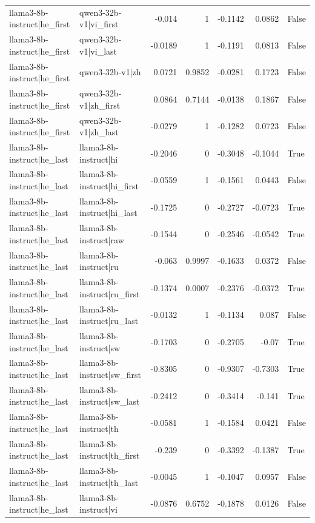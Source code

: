 \begin{table}
\begin{tabular}{l l r r r r l}
llama3-8b-instruct|he_first & qwen3-32b-v1|vi_first & -0.014 & 1 & -0.1142 & 0.0862 & False \\
llama3-8b-instruct|he_first & qwen3-32b-v1|vi_last & -0.0189 & 1 & -0.1191 & 0.0813 & False \\
llama3-8b-instruct|he_first & qwen3-32b-v1|zh & 0.0721 & 0.9852 & -0.0281 & 0.1723 & False \\
llama3-8b-instruct|he_first & qwen3-32b-v1|zh_first & 0.0864 & 0.7144 & -0.0138 & 0.1867 & False \\
llama3-8b-instruct|he_first & qwen3-32b-v1|zh_last & -0.0279 & 1 & -0.1282 & 0.0723 & False \\
llama3-8b-instruct|he_last & llama3-8b-instruct|hi & -0.2046 & 0 & -0.3048 & -0.1044 & True \\
llama3-8b-instruct|he_last & llama3-8b-instruct|hi_first & -0.0559 & 1 & -0.1561 & 0.0443 & False \\
llama3-8b-instruct|he_last & llama3-8b-instruct|hi_last & -0.1725 & 0 & -0.2727 & -0.0723 & True \\
llama3-8b-instruct|he_last & llama3-8b-instruct|raw & -0.1544 & 0 & -0.2546 & -0.0542 & True \\
llama3-8b-instruct|he_last & llama3-8b-instruct|ru & -0.063 & 0.9997 & -0.1633 & 0.0372 & False \\
llama3-8b-instruct|he_last & llama3-8b-instruct|ru_first & -0.1374 & 0.0007 & -0.2376 & -0.0372 & True \\
llama3-8b-instruct|he_last & llama3-8b-instruct|ru_last & -0.0132 & 1 & -0.1134 & 0.087 & False \\
llama3-8b-instruct|he_last & llama3-8b-instruct|sw & -0.1703 & 0 & -0.2705 & -0.07 & True \\
llama3-8b-instruct|he_last & llama3-8b-instruct|sw_first & -0.8305 & 0 & -0.9307 & -0.7303 & True \\
llama3-8b-instruct|he_last & llama3-8b-instruct|sw_last & -0.2412 & 0 & -0.3414 & -0.141 & True \\
llama3-8b-instruct|he_last & llama3-8b-instruct|th & -0.0581 & 1 & -0.1584 & 0.0421 & False \\
llama3-8b-instruct|he_last & llama3-8b-instruct|th_first & -0.239 & 0 & -0.3392 & -0.1387 & True \\
llama3-8b-instruct|he_last & llama3-8b-instruct|th_last & -0.0045 & 1 & -0.1047 & 0.0957 & False \\
llama3-8b-instruct|he_last & llama3-8b-instruct|vi & -0.0876 & 0.6752 & -0.1878 & 0.0126 & False \\

\end{tabular}
\end{table}
